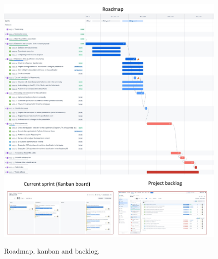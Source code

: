 \begin{figure}[htbp]
    \raggedright
        \caption{Roadmap, kanban and backlog.}
        \includegraphics[width=1\textwidth]{resources/images/070-conclusion/Conclusion_roadmap_01.jpg}
        \label{fig:conclusion_roadmap_1}
\end{figure}